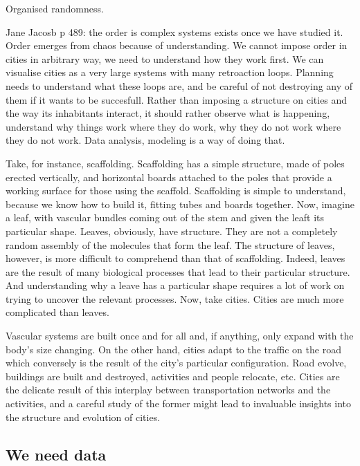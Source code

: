 Organised randomness. 

Jane Jacosb p 489: the order is complex systems exists once we have studied it.
Order emerges from chaos because of understanding. We cannot impose order in
cities in arbitrary way, we need to understand how they work first. We can
visualise cities as a very large systems with many retroaction loops. Planning
needs to understand what these loops are, and be careful of not destroying any
of them if it wants to be succesfull. Rather than imposing a structure on cities
and the way its inhabitants interact, it should rather observe what is
happening, understand why things work where they do work, why they do not work
where they do not work. Data analysis, modeling is a way of doing that.

Take, for instance, scaffolding. Scaffolding has a simple structure, made of
poles erected vertically, and horizontal boards attached to the poles that provide a
working surface for those using the scaffold. Scaffolding is simple to
understand, because we know how to build it, fitting tubes and boards together.
Now, imagine a leaf, with vascular bundles coming out of the stem and given the
leaft its particular shape. Leaves, obviously, have structure. They are not a
completely random assembly of the molecules that form the leaf. The structure of
leaves, however, is more difficult to comprehend than that of scaffolding.
Indeed, leaves are the result of many biological processes that lead to their
particular structure. And understanding why a leave has a particular shape
requires a lot of work on trying to uncover the relevant processes. 
Now, take cities. Cities are much more complicated than leaves.


Vascular systems are built once and for all and, if anything, only expand with
the body's size changing. On the other hand, cities adapt to the traffic on the
road which conversely is the result of the city's particular configuration.
Road evolve, buildings are built and destroyed, activities and people relocate,
etc. Cities are the delicate result of this interplay between transportation
networks and the activities, and a careful study of the former might lead to
invaluable insights into the structure and evolution of cities.




\subsection{We need data}
\label{sub:we_need_data}


